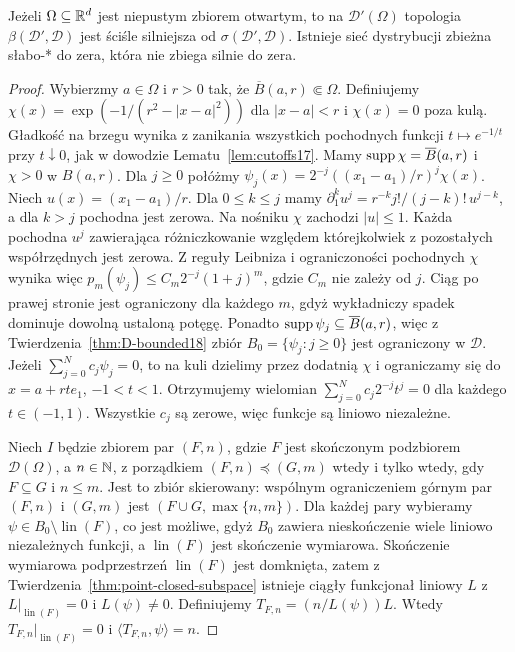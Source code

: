\begin{twierdzenie}
\label{thm:weak-strong-different19}
Jeżeli $\Omega\subseteq\mathbb R^d$ jest niepustym zbiorem
otwartym, to na $\mathcal D'(\Omega)$ topologia
$\beta(\mathcal D',\mathcal D)$ jest ściśle silniejsza
od $\sigma(\mathcal D',\mathcal D)$. Istnieje sieć
dystrybucji zbieżna słabo-* do zera, która nie
zbiega silnie do zera.
\end{twierdzenie}
\begin{proof}
Wybierzmy $a\in\Omega$ i $r>0$ tak, że
$\overline B(a,r)\Subset\Omega$. Definiujemy
$\chi(x)=\exp(-1/(r^2-|x-a|^2))$ dla $|x-a|<r$
i $\chi(x)=0$ poza kulą.
Gładkość na brzegu wynika z zanikania wszystkich pochodnych
funkcji $t\mapsto e^{-1/t}$ przy $t\downarrow0$,
jak w dowodzie Lematu~\ref{lem:cutoffs17}.
Mamy $\operatorname{supp}\chi=\overline B(a,r)$ i $\chi>0$ w $B(a,r)$.
Dla $j\ge0$ połóżmy
$\psi_j(x)=2^{-j}((x_1-a_1)/r)^j\chi(x)$.
Niech $u(x)=(x_1-a_1)/r$. Dla $0\le k\le j$ mamy
$\partial_1^k u^j=r^{-k}j!/(j-k)!\,u^{j-k}$,
a dla $k>j$ pochodna jest zerowa.
Na nośniku $\chi$ zachodzi $|u|\le1$.
Każda pochodna $u^j$ zawierająca różniczkowanie względem
którejkolwiek z pozostałych współrzędnych jest zerowa.
Z reguły Leibniza i ograniczoności pochodnych $\chi$
wynika więc $p_m(\psi_j)\le C_m 2^{-j}(1+j)^m$,
gdzie $C_m$ nie zależy od $j$. Ciąg po prawej stronie
jest ograniczony dla każdego $m$, gdyż wykładniczy
spadek dominuje dowolną ustaloną potęgę.
Ponadto $\operatorname{supp}\psi_j\subseteq\overline B(a,r)$,
więc z Twierdzenia~\ref{thm:D-bounded18}
zbiór $B_0=\{\psi_j:j\ge0\}$ jest ograniczony w $\mathcal D$.
Jeżeli $\sum_{j=0}^N c_j\psi_j=0$, to na kuli dzielimy
przez dodatnią $\chi$ i ograniczamy się do $x=a+rt e_1$,
$-1<t<1$. Otrzymujemy wielomian
$\sum_{j=0}^N c_j2^{-j}t^j=0$ dla każdego $t\in(-1,1)$.
Wszystkie $c_j$ są zerowe, więc funkcje są liniowo niezależne.

Niech $I$ będzie zbiorem par $(F,n)$, gdzie $F$ jest
skończonym podzbiorem $\mathcal D(\Omega)$, a $n\in\mathbb N$,
z porządkiem $(F,n)\preceq(G,m)$ wtedy i tylko wtedy,
gdy $F\subseteq G$ i $n\le m$. Jest to zbiór skierowany:
wspólnym ograniczeniem górnym par $(F,n)$ i $(G,m)$
jest $(F\cup G,\max\{n,m\})$.
Dla każdej pary wybieramy $\psi\in B_0\setminus\operatorname{lin}(F)$,
co jest możliwe, gdyż $B_0$ zawiera nieskończenie wiele
liniowo niezależnych funkcji, a $\operatorname{lin}(F)$
jest skończenie wymiarowa.
Skończenie wymiarowa podprzestrzeń
$\operatorname{lin}(F)$ jest domknięta, zatem
z Twierdzenia~\ref{thm:point-closed-subspace}
istnieje ciągły funkcjonał liniowy $L$ z
$L|_{\operatorname{lin}(F)}=0$ i $L(\psi)\ne0$.
Definiujemy $T_{F,n}=(n/L(\psi))L$. Wtedy
$T_{F,n}|_{\operatorname{lin}(F)}=0$ i
$\langle T_{F,n},\psi\rangle=n$.


\end{proof}
